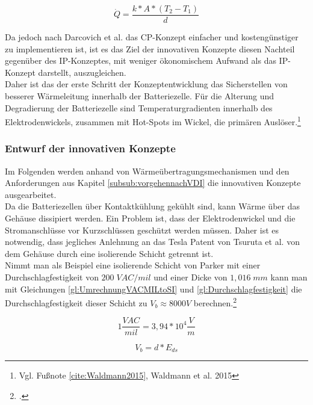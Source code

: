 \begin{equation}
	\dot{Q} = \frac{k * A * ( T_{2} - T_{1})}{d}
	\label{gl:HeatTransferEquationInnovativ}
\end{equation}

Da jedoch nach Darcovich et al. das CP-Konzept einfacher und kostengünstiger zu implementieren ist, ist es das Ziel der innovativen Konzepte diesen Nachteil gegenüber des IP-Konzeptes, mit weniger ökonomischem Aufwand als das IP-Konzept darstellt, auszugleichen.\\
Daher ist das der erste Schritt der Konzeptentwicklung das Sicherstellen von besserer Wärmeleitung innerhalb der Batteriezelle. Für die Alterung und Degradierung der Batteriezelle sind Temperaturgradienten innerhalb des Elektrodenwickels, zusammen mit Hot-Spots im Wickel, die primären Auslöser.\footnote{Vgl. Fußnote \ref{cite:Waldmann2015}, Waldmann et al. 2015}\\

\subsubsection*{Entwurf der innovativen Konzepte}

Im Folgenden werden anhand von Wärmeübertragungsmechanismen und den Anforderungen aus Kapitel \ref{subsub:vorgehennachVDI} die innovativen Konzepte ausgearbeitet.\\
Da die Batteriezellen über Kontaktkühlung gekühlt sind, kann Wärme über das Gehäuse dissipiert werden. Ein Problem ist, dass der Elektrodenwickel und die Stromanschlüsse vor Kurzschlüssen geschützt werden müssen. Daher ist es notwendig, dass jegliches Anlehnung an das Tesla Patent von Tsuruta et al. von dem Gehäuse durch eine isolierende Schicht getrennt ist.\\
Nimmt man als Beispiel eine isolierende Schicht von Parker\textsuperscript{\textregistered} mit einer Durchschlagfestigkeit von $200\;VAC/mil$ und einer Dicke von $1,016\;mm$ kann man mit Gleichungen \ref{gl:UmrechnungVACMILtoSI} und \ref{gl:Durchschlagfestigkeit} die Durchschlagfestigkeit dieser Schicht zu $V_{b} \approx 8000 V$ berechnen.\footcite[Vgl.\label{cite:ParkerPads}][]{Parker.2021}

\begin{equation}
	1 \frac{VAC}{mil} = 3,94 * 10^{4} \frac{V}{m}
	\label{gl:UmrechnungVACMILtoSI}
\end{equation}

\begin{equation}
	V_{b} = d * E_{ds}
	\label{gl:Durchschlagfestigkeit}
\end{equation}

